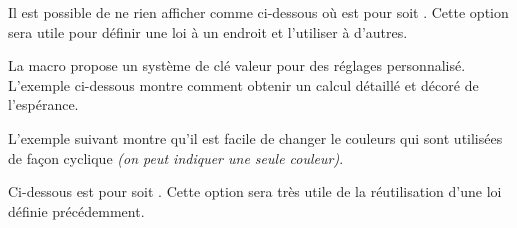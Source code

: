 \documentclass[12pt,a4paper]{article}
\begin{document}
\begin{remark}
    Il est possible de ne rien afficher comme ci-dessous où  est pour  soit .
    Cette option sera utile pour définir une loi à un endroit et l'utiliser à d'autres.

\begin{latexex-flat}
\end{latexex-flat}
\end{remark}





La macro  propose un système de clé valeur pour des réglages personnalisé. L'exemple ci-dessous montre comment obtenir un calcul détaillé et décoré de l'espérance.

\begin{latexex-flat}
\end{latexex-flat}


L'exemple suivant montre qu'il est facile de changer le couleurs qui sont utilisées de façon cyclique \emph{(on peut indiquer une seule couleur)}.

\begin{latexex-flat}
\end{latexex-flat}





Ci-dessous  est pour  soit . Cette option sera très utile de la réutilisation d'une loi définie précédemment.

\begin{latexex-flat}
\end{latexex-flat}
\end{document}
